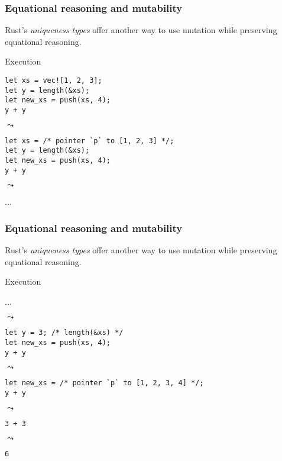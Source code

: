 \documentclass[t]{beamer}
\begin{document}
\begin{frame}[fragile]
\frametitle{Equational reasoning and mutability}
Rust's \emph{uniqueness types} offer another way to use mutation while
preserving equational reasoning.

\begin{block}{Execution}

\begin{verbatim}
let xs = vec![1, 2, 3];
let y = length(&xs);
let new_xs = push(xs, 4);
y + y
\end{verbatim}

\(\leadsto\)

\begin{verbatim}
let xs = /* pointer `p` to [1, 2, 3] */;
let y = length(&xs);
let new_xs = push(xs, 4);
y + y
\end{verbatim}

\(\leadsto\)

...

\end{block}

\end{frame}


\begin{frame}[fragile]
\frametitle{Equational reasoning and mutability}
Rust's \emph{uniqueness types} offer another way to use mutation while
preserving equational reasoning.

\begin{block}{Execution}

...

\(\leadsto\)

\begin{verbatim}
let y = 3; /* length(&xs) */
let new_xs = push(xs, 4);
y + y
\end{verbatim}

\(\leadsto\)

\begin{verbatim}
let new_xs = /* pointer `p` to [1, 2, 3, 4] */;
y + y
\end{verbatim}

\(\leadsto\)

\begin{verbatim}
3 + 3
\end{verbatim}

\(\leadsto\)

\begin{verbatim}
6
\end{verbatim}

\end{block}

\end{frame}
\end{document}
